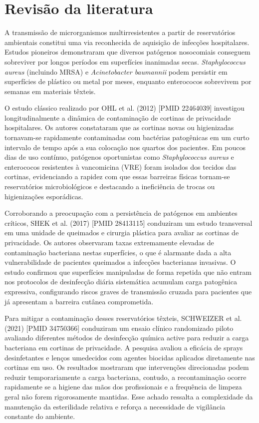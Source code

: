 \documentclass[12pt,a4paper]{article}
\begin{document}
\section{Revisão da literatura}
A transmissão de microrganismos multirresistentes a partir de reservatórios ambientais constitui uma via reconhecida de aquisição de infecções hospitalares. Estudos pioneiros demonstraram que diversos patógenos nosocomiais conseguem sobreviver por longos períodos em superfícies inanimadas secas. \textit{Staphylococcus aureus} (incluindo MRSA) e \textit{Acinetobacter baumannii} podem persistir em superfícies de plástico ou metal por meses, enquanto enterococos sobrevivem por semanas em materiais têxteis.

O estudo clássico realizado por OHL et al. (2012) [PMID 22464039] investigou longitudinalmente a dinâmica de contaminação de cortinas de privacidade hospitalares. Os autores constataram que as cortinas novas ou higienizadas tornavam-se rapidamente contaminadas com bactérias patogênicas em um curto intervalo de tempo após a sua colocação nos quartos dos pacientes. Em poucos dias de uso contínuo, patógenos oportunistas como \textit{Staphylococcus aureus} e enterococos resistentes à vancomicina (VRE) foram isolados dos tecidos das cortinas, evidenciando a rapidez com que essas barreiras físicas tornam-se reservatórios microbiológicos e destacando a ineficiência de trocas ou higienizações esporádicas.

Corroborando a preocupação com a persistência de patógenos em ambientes críticos, SHEK et al. (2017) [PMID 28413115] conduziram um estudo transversal em uma unidade de queimados e cirurgia plástica para avaliar as cortinas de privacidade. Os autores observaram taxas extremamente elevadas de contaminação bacteriana nestas superfícies, o que é alarmante dada a alta vulnerabilidade de pacientes queimados a infecções bacterianas invasivas. O estudo confirmou que superfícies manipuladas de forma repetida que não entram nos protocolos de desinfecção diária sistemática acumulam carga patogênica expressiva, configurando riscos graves de transmissão cruzada para pacientes que já apresentam a barreira cutânea comprometida.

Para mitigar a contaminação desses reservatórios têxteis, SCHWEIZER et al. (2021) [PMID 34750366] conduziram um ensaio clínico randomizado piloto avaliando diferentes métodos de desinfecção química active para reduzir a carga bacteriana em cortinas de privacidade. A pesquisa avaliou a eficácia de sprays desinfetantes e lenços umedecidos com agentes biocidas aplicados diretamente nas cortinas em uso. Os resultados mostraram que intervenções direcionadas podem reduzir temporariamente a carga bacteriana, contudo, a recontaminação ocorre rapidamente se a higiene das mãos dos profissionais e a frequência de limpeza geral não forem rigorosamente mantidas. Esse achado ressalta a complexidade da manutenção da esterilidade relativa e reforça a necessidade de vigilância constante do ambiente.
\end{document}
